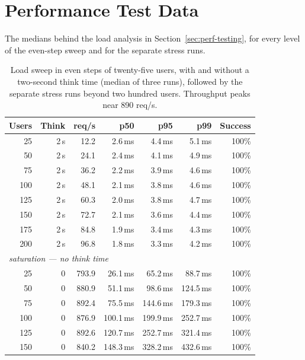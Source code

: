 \documentclass[a4paper]{article}
\begin{document}
\newpage
\section{Performance Test Data}
\label{appendix:perf-data}

The medians behind the load analysis in Section~\ref{sec:perf-testing}, for every
level of the even-step sweep and for the separate stress runs.

\begin{table}[H]
\centering
\caption{Load sweep in even steps of twenty-five users, with and without a
two-second think time (median of three runs), followed by the separate stress
runs beyond two hundred users. Throughput peaks near 890 req/s.}
\label{tab:loadtest}
\small
\begin{tabular}{|r|r|r|r|r|r|r|}
\hline
\textbf{Users} & \textbf{Think} & \textbf{req/s} & \textbf{p50} & \textbf{p95} & \textbf{p99} & \textbf{Success} \\
\hline
 25 & 2\,s & 12.2 & 2.6\,ms & 4.4\,ms & 5.1\,ms & 100\% \\
\hline
 50 & 2\,s & 24.1 & 2.4\,ms & 4.1\,ms & 4.9\,ms & 100\% \\
\hline
 75 & 2\,s & 36.2 & 2.2\,ms & 3.9\,ms & 4.6\,ms & 100\% \\
\hline
100 & 2\,s & 48.1 & 2.1\,ms & 3.8\,ms & 4.6\,ms & 100\% \\
\hline
125 & 2\,s & 60.3 & 2.0\,ms & 3.8\,ms & 4.7\,ms & 100\% \\
\hline
150 & 2\,s & 72.7 & 2.1\,ms & 3.6\,ms & 4.4\,ms & 100\% \\
\hline
175 & 2\,s & 84.8 & 1.9\,ms & 3.4\,ms & 4.3\,ms & 100\% \\
\hline
200 & 2\,s & 96.8 & 1.8\,ms & 3.3\,ms & 4.2\,ms & 100\% \\
\hline
\multicolumn{7}{|l|}{\emph{saturation --- no think time}} \\
\hline
 25 & 0 & 793.9 & 26.1\,ms & 65.2\,ms & 88.7\,ms & 100\% \\
\hline
 50 & 0 & 880.9 & 51.1\,ms & 98.6\,ms & 124.5\,ms & 100\% \\
\hline
 75 & 0 & 892.4 & 75.5\,ms & 144.6\,ms & 179.3\,ms & 100\% \\
\hline
100 & 0 & 876.9 & 100.1\,ms & 199.9\,ms & 252.7\,ms & 100\% \\
\hline
125 & 0 & 892.6 & 120.7\,ms & 252.7\,ms & 321.4\,ms & 100\% \\
\hline
150 & 0 & 840.2 & 148.3\,ms & 328.2\,ms & 432.6\,ms & 100\% \\

\end{tabular}
\end{table}
\end{document}
